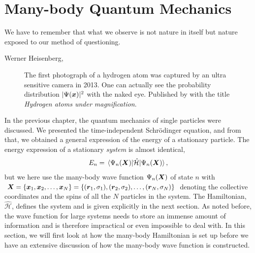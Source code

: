 \chapter{Many-body Quantum Mechanics} \label{chp:manybody}
\epigraph{We have to remember that what we observe is not nature in itself but
	nature exposed to our method of questioning.}{Werner Heisenberg, \cite{heisenberg_across_1990}}
\begin{figure}[H]
	\centering
	\captionsetup[subfigure]{labelformat=empty}
	\caption{The first photograph of a hydrogen atom was captured by an ultra sensitive camera in 2013. One can actually see the probability distribution $|\Psi(\boldsymbol{{x}})|^2$ with the naked eye. Published by \citet{stodolna_hydrogen_2013} with the title \textit{Hydrogen atoms under magnification}.}
\end{figure}

\sloppy
In the previous chapter, the quantum mechanics of single particles were discussed. We presented the time-independent Schrödinger equation, and from that, we obtained a general expression of the energy of a stationary particle. The energy expression of a stationary \textit{system} is almost identical,
\begin{equation}
E_n=\mel{\Psi_n(\bs{X})}{\hat{\mathcal{H}}}{\Psi_n(\bs{X})},
\label{eq:energy}
\end{equation}
but we here use the many-body wave function $\Psi_n(\boldsymbol{{X}})$ of state $n$ with $\boldsymbol{{X}}=\{\boldsymbol{{x}}_1,\boldsymbol{{x}}_2,\hdots,\boldsymbol{{x}}_N\}=\{(\boldsymbol{{r}}_1, \sigma_1), (\boldsymbol{{r}}_2, \sigma_2),\hdots,(\boldsymbol{{r}}_N, \sigma_N)\}$ denoting the collective coordinates and the spins of all the $N$ particles in the system. The Hamiltonian, $\hat{\mathcal{H}}$, defines the system and is given explicitly in the next section. As noted before, the wave function for large systems needs to store an immense amount of information and is therefore impractical or even impossible to deal with. In this section, we will first look at how the many-body Hamiltonian is set up before we have an extensive discussion of how the many-body wave function is constructed.

